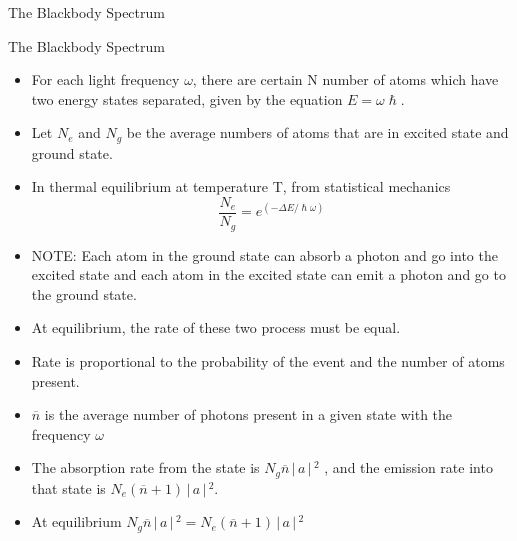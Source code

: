 \documentclass[aspectratio=169]{beamer}
\begin{document}
\begin{frame}{The Blackbody Spectrum}

\end{frame}
\begin{frame}{The Blackbody Spectrum}
	\begin{itemize}
	 \item For each light frequency $\omega$, there are certain N number of atoms which have two energy states separated, given by the equation $E = \omega\hslash$.
	 \item Let $N_{e}$ and $N_{g}$ be the average numbers of atoms that are in excited state and ground state.
	 \item In thermal equilibrium at temperature T, from statistical mechanics \[ \frac{N_e}{N_g} = e^{\left(-\Delta E / \hslash \omega \right)}\]
	\item NOTE: Each atom in the ground state can absorb a photon and go into the excited state and each atom in the excited state can emit a photon and go to the ground state.
	\end{itemize}
\end{frame} 

\begin{frame}
	\begin{itemize}
		\item At equilibrium, the rate of these two process must be equal. \newline
		\item Rate is proportional to the probability of the event and the number of atoms present.\newline
		\item $\overline{n}$ is the average number of photons present in a given state with the frequency $\omega$
	\end{itemize}
\end{frame}

\begin{frame}
	\begin{itemize}
		\item The absorption rate from the state is $N_{g}\overline{n}\,\Bigr\rvert\,a\,\Bigr\rvert\,^{2}$ , and the emission rate into that state is $N_{e}(\overline{n}+1)\,\Bigr\rvert\,a\,\Bigr\rvert\,^{2}$.
		\item At equilibrium  $N_{g}\overline{n}\,\Bigr\rvert\,a\,\Bigr\rvert\,^{2} = N_{e}(\overline{n}+1)\,\Bigr\rvert\,a\,\Bigr\rvert\,^{2}$
	\end{itemize}
\end{frame}
\end{document}
